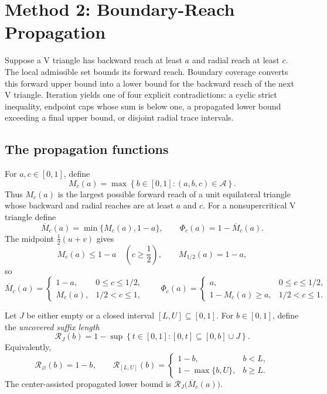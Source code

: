 \section{Method 2: Boundary-Reach Propagation}
\label{sec:strategy2-summary}

Suppose a V triangle has backward reach at least $a$ and radial reach at
least $c$.  The local admissible set bounds its forward reach.  Boundary
coverage converts this forward upper bound into a lower bound for the backward
reach of the next V triangle.  Iteration yields one of four explicit
contradictions: a cyclic strict inequality, endpoint caps whose sum is below
one, a propagated lower bound exceeding a final upper bound, or disjoint radial
trace intervals.

\subsection{The propagation functions}

\begin{definition}
\label{def:body-transfer-alphabet}
For $a,c\in[0,1]$, define
\[
 M_c(a)=\max\left\{b\in[0,1]:(a,b,c)\in\mathcal A\right\}.
\]
Thus $M_c(a)$ is the largest possible forward reach of a unit equilateral
triangle whose backward and radial reaches are at least $a$ and $c$.  For a
nonsupercritical V triangle define
\[
 \overline M_c(a)=\min\{M_c(a),1-a\},
 \qquad
 \Phi_c(a)=1-\overline M_c(a).
\]
The midpoint $\frac12(u+v)$ gives
\begin{equation}
 M_c(a)\le1-a\quad\left(c\ge\frac12\right),
 \qquad
 M_{1/2}(a)=1-a,
 \label{eq:body-midpoint-threshold}
\end{equation}
so
\[
 \overline M_c(a)=
 \begin{cases}
 1-a,&0\le c\le1/2,\\
 M_c(a),&1/2<c\le1,
 \end{cases}
 \qquad
 \Phi_c(a)=
 \begin{cases}
 a,&0\le c\le1/2,\\
 1-M_c(a)\ge a,&1/2<c\le1.
 \end{cases}
\]
\end{definition}

\begin{definition}
\label{def:body-center-assisted-transfer}
Let $J$ be either empty or a closed interval $[L,U]\subseteq[0,1]$.  For
$b\in[0,1]$, define the \emph{uncovered suffix length}
\[
 \mathcal R_J(b)=1-\sup\left\{t\in[0,1]:[0,t]\subseteq[0,b]\cup J\right\}.
\]
Equivalently,
\[
 \mathcal R_\varnothing(b)=1-b,
 \qquad
 \mathcal R_{[L,U]}(b)=
 \begin{cases}
 1-b,&b<L,\\
 1-\max\{b,U\},&b\ge L.
 \end{cases}
\]
The center-assisted propagated lower bound is
$\mathcal R_J\bigl(\overline M_c(a)\bigr)$.
\end{definition}


